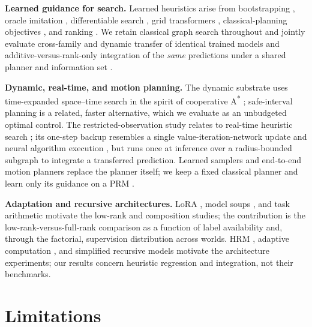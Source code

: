 \documentclass[letterpaper]{article} %
\begin{document}
\textbf{Learned guidance for search.} Learned heuristics arise from bootstrapping \citep{arfaee2011bootstrap}, oracle imitation \citep{bhardwaj2017sail}, differentiable search \citep{yonetani2021neuralastar}, grid transformers \citep{kirilenko2023transpath}, classical-planning objectives \citep{ferber2020neural}, and ranking \citep{chrestien2023rank}. We retain classical graph search throughout and jointly evaluate cross-family and dynamic transfer of identical trained models and additive-versus-rank-only integration of the \emph{same} predictions under a shared planner and information set \citep{pohl1970,pearl1982semiadmissible,aine2016mha}.

\textbf{Dynamic, real-time, and motion planning.} The dynamic substrate uses time-expanded space--time search in the spirit of cooperative A\textsuperscript{*} \citep{silver2005cooperative}; safe-interval planning \citep{phillips2011sipp} is a related, faster alternative, which we evaluate as an unbudgeted optimal control. The restricted-observation study relates to real-time heuristic search \citep{korf1990rta,koenig2006rtaa}; its one-step backup resembles a single value-iteration-network update \citep{tamar2016vin,lee2018gppn} and neural algorithm execution \citep{velickovic2021nar}, but runs once at inference over a radius-bounded subgraph to integrate a transferred prediction. Learned samplers and end-to-end motion planners \citep{ichter2018sampling,qureshi2019mpnet} replace the planner itself; we keep a fixed classical planner and learn only its guidance on a PRM \citep{kavraki1996prm}.

\textbf{Adaptation and recursive architectures.} LoRA \citep{hu2021lora}, model soups \citep{wortsman2022soups}, and task arithmetic \citep{ilharco2022task} motivate the low-rank and composition studies; the contribution is the low-rank-versus-full-rank comparison as a function of label availability and, through the factorial, supervision distribution across worlds. HRM \citep{wang2025hrm}, adaptive computation \citep{graves2016act,banino2021pondernet}, and simplified recursive models \citep{jolicoeur2025trm} motivate the architecture experiments; our results concern heuristic regression and integration, not their benchmarks.

\section{Limitations}
\end{document}
